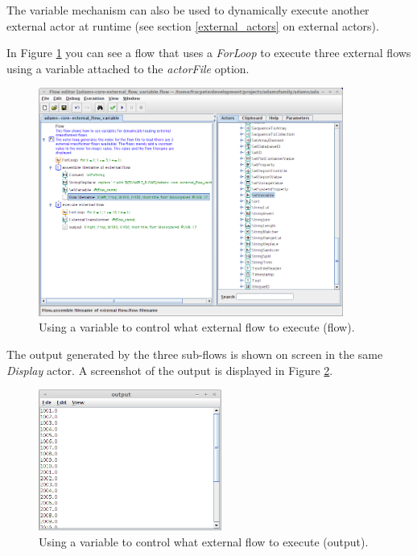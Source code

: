 The variable mechanism can also be used to dynamically execute another external
actor at runtime (see section \ref{external_actors} on external actors).

In Figure \ref{floweditor-variables2_flow} you can see a flow that uses a
\textit{ForLoop} to execute three external flows using a variable attached to
the \textit{actorFile} option.
\begin{figure}[htb]
  \centering
  \includegraphics[width=10.0cm]{images/floweditor-variables2_flow.png}
  \caption{Using a variable to control what external flow to execute (flow).}
  \label{floweditor-variables2_flow}
\end{figure}

The output generated by the three sub-flows is shown on screen in the same
\textit{Display} actor. A screenshot of the output is displayed in Figure
\ref{floweditor-variables2_output}.
\begin{figure}[htb]
  \centering
  \includegraphics[width=6.0cm]{images/floweditor-variables2_output.png}
  \caption{Using a variable to control what external flow to execute (output).}
  \label{floweditor-variables2_output}
\end{figure}


